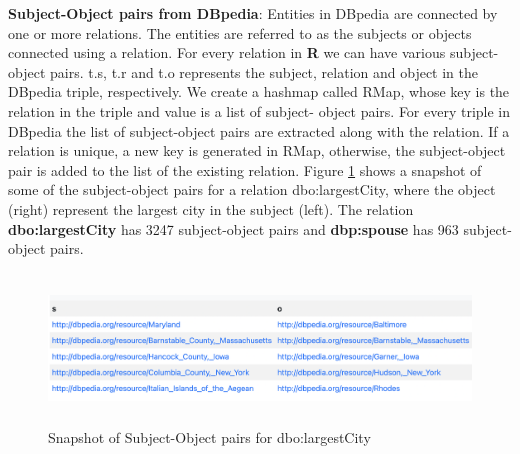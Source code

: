 \begin{sloppypar}
\textbf{Subject-Object pairs from DBpedia}: Entities in DBpedia are connected by one or more relations. The entities are referred to as the subjects or objects connected using a relation. For every relation in \textbf{R} we can have various subject-object pairs. t.s, t.r and t.o represents the subject, relation and object in the DBpedia triple, respectively. We create a hashmap called RMap, whose key is the relation in the triple and value is a list of subject- object pairs. For every triple in DBpedia the list of subject-object pairs are extracted along with the relation. If a relation is unique, a new key is generated in RMap, otherwise, the subject-object pair is added to the list of the existing relation.
Figure \ref{fig:subject-object} shows a snapshot of some of the subject-object pairs for a relation dbo:largestCity, where the object (right) represent the largest city in the subject (left). The relation \textbf{dbo:largestCity} has 3247 subject-object pairs and \textbf{dbp:spouse} has 963 subject-object pairs.

\begin{figure}
    \centering
   \includegraphics[width=15cm, height=4cm]{chapters/figures/subject-object.png}
    \caption{Snapshot of Subject-Object pairs for dbo:largestCity}
    \label{fig:subject-object}
\end{figure}


\end{sloppypar}
